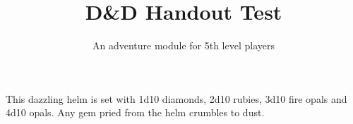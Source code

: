 \documentclass[]{rpghandout}
\title{D\&D Handout Test}
\subtitle{An adventure module for 5th level players}
\begin{document}
    \maketitle{}

    This dazzling helm is set with 1d10 diamonds, 2d10 rubies, 3d10 fire opals and 4d10 opals. Any gem pried from the helm crumbles to dust.

	\Blindtext
\end{document}
